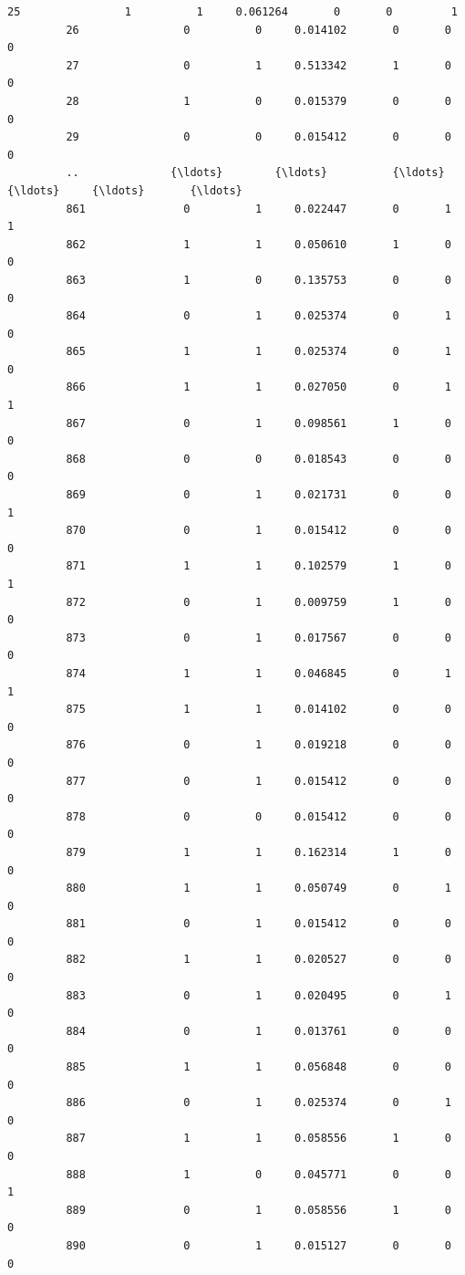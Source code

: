 \documentclass[11pt]{article}
\begin{document}
\begin{Verbatim}[commandchars=\\\{\}]
         25                1          1     0.061264       0       0         1   
         26                0          0     0.014102       0       0         0   
         27                0          1     0.513342       1       0         0   
         28                1          0     0.015379       0       0         0   
         29                0          0     0.015412       0       0         0   
         ..              {\ldots}        {\ldots}          {\ldots}     {\ldots}     {\ldots}       {\ldots}   
         861               0          1     0.022447       0       1         1   
         862               1          1     0.050610       1       0         0   
         863               1          0     0.135753       0       0         0   
         864               0          1     0.025374       0       1         0   
         865               1          1     0.025374       0       1         0   
         866               1          1     0.027050       0       1         1   
         867               0          1     0.098561       1       0         0   
         868               0          0     0.018543       0       0         0   
         869               0          1     0.021731       0       0         1   
         870               0          1     0.015412       0       0         0   
         871               1          1     0.102579       1       0         1   
         872               0          1     0.009759       1       0         0   
         873               0          1     0.017567       0       0         0   
         874               1          1     0.046845       0       1         1   
         875               1          1     0.014102       0       0         0   
         876               0          1     0.019218       0       0         0   
         877               0          1     0.015412       0       0         0   
         878               0          0     0.015412       0       0         0   
         879               1          1     0.162314       1       0         0   
         880               1          1     0.050749       0       1         0   
         881               0          1     0.015412       0       0         0   
         882               1          1     0.020527       0       0         0   
         883               0          1     0.020495       0       1         0   
         884               0          1     0.013761       0       0         0   
         885               1          1     0.056848       0       0         0   
         886               0          1     0.025374       0       1         0   
         887               1          1     0.058556       1       0         0   
         888               1          0     0.045771       0       0         1   
         889               0          1     0.058556       1       0         0   
         890               0          1     0.015127       0       0         0   
         

\end{Verbatim}
\end{document}
